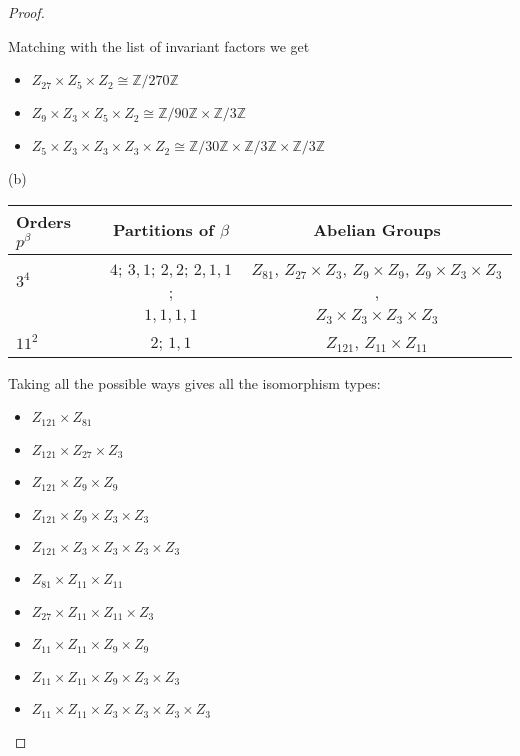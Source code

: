 \documentclass[10pt]{article}
\newcommand{\Z}{\mathbb{Z}}
\begin{document}
\begin{itemize}
\begin{proof}
\begin{item}
Matching with the list of invariant factors we get
 \begin{itemize}
	\item $Z_{27} \times Z_{5} \times Z_{2} \cong \Z / 270\Z$
	\item $Z_9 \times Z_3 \times Z_{5} \times Z_{2} \cong \Z / 90\Z \times \Z / 3\Z$
	\item $Z_5 \times Z_3 \times Z_3 \times Z_{3} \times Z_{2} \cong \Z / 30\Z \times \Z / 3\Z \times \Z / 3\Z$ 
\end{itemize}


\end{item}


\begin{item} (b)
\begin{center}
  \begin{tabular}{ l c c  }
    Orders $p^{\beta}$ & Partitions of $\beta$ & Abelian Groups\\ \hline
    $3^4$ & $4$; $3,1$; $2,2$; $2,1,1$;& $Z_{81}$, $Z_{27} \times Z_3 $, $Z_9 \times Z_9$, $Z_9 \times Z_3 \times Z_3$,\\
    $\text{ }$ &  $1,1,1,1$ & $Z_3 \times Z_3 \times Z_3 \times Z_3$ \\ \hline   
		$11^{2}$ & $2$; $1,1$ & $Z_{121}$, $Z_{11}\times Z_{11}$ \\ \hline
	\hline
  \end{tabular}
\end{center} 

Taking all the possible ways gives all the isomorphism types:

\begin{itemize}
	\item $Z_{121} \times Z_{81}$
	\item $Z_{121} \times Z_{27} \times Z_3$
	\item $Z_{121} \times Z_9 \times Z_9$ 
	\item $Z_{121} \times Z_9 \times Z_3 \times Z_3$
	\item $Z_{121} \times Z_3 \times Z_3 \times Z_3 \times Z_3$
	\item $Z_{81} \times Z_{11} \times Z_{11}$
	\item $Z_{27} \times Z_{11} \times Z_{11} \times Z_3$
	\item $Z_{11} \times Z_{11} \times Z_9 \times Z_9$ 
	\item $Z_{11} \times Z_{11} \times Z_9 \times Z_3 \times Z_3$
	\item $Z_{11} \times Z_{11} \times Z_3 \times Z_3 \times Z_3 \times Z_3$
	\end{itemize}


\end{item}
\end{proof}
\end{itemize}
\end{document}
